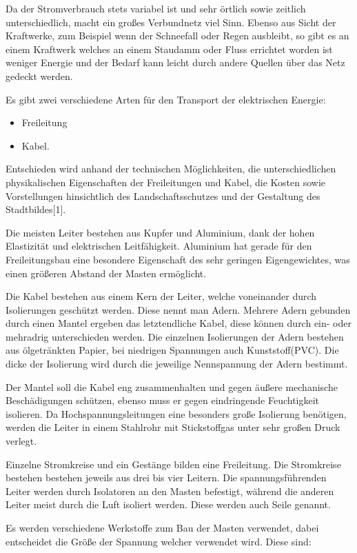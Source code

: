 Da der Stromverbrauch stets variabel ist und sehr örtlich sowie zeitlich unterschiedlich, macht ein großes Verbundnetz viel Sinn. Ebenso aus Sicht der Kraftwerke, zum Beispiel wenn der Schneefall oder Regen ausbleibt, so gibt es an einem Kraftwerk welches an einem Staudamm oder Fluss errichtet worden ist weniger Energie und der Bedarf kann leicht durch andere Quellen über das Netz gedeckt werden.\newline

Es gibt zwei verschiedene Arten für den Transport der elektrischen Energie:
\begin{itemize}
	\item Freileitung
	\item Kabel.
\end{itemize} 
Entschieden wird anhand der technischen Möglichkeiten, die unterschiedlichen physikalischen Eigenschaften der Freileitungen und Kabel, die Kosten sowie Vorstellungen hinsichtlich des Landschaftsschutzes und der Gestaltung des Stadtbildes[1].

Die meisten Leiter bestehen aus Kupfer und Aluminium, dank der hohen Elastizität und elektrischen Leitfähigkeit. Aluminium hat gerade für den Freileitungsbau eine besondere Eigenschaft des sehr geringen Eigengewichtes, was einen größeren Abstand der Masten ermöglicht.

Die Kabel bestehen aus einem Kern der Leiter, welche voneinander durch Isolierungen geschützt werden. Diese nennt man Adern. Mehrere Adern gebunden durch einen Mantel ergeben das letztendliche Kabel, diese können durch ein- oder mehradrig unterschieden werden. Die einzelnen Isolierungen der Adern bestehen aus ölgetränkten Papier, bei niedrigen Spannungen auch Kunststoff(PVC). Die dicke der Isolierung wird durch die jeweilige Nennspannung der Adern bestimmt.

Der Mantel soll die Kabel eng zusammenhalten und gegen äußere mechanische Beschädigungen schützen, ebenso muss er gegen eindringende Feuchtigkeit isolieren. Da Hochspannungsleitungen eine besonders große Isolierung benötigen, werden die Leiter in einem Stahlrohr mit Stickstoffgas unter sehr großen Druck verlegt.

Einzelne Stromkreise und ein Gestänge bilden eine Freileitung. Die Stromkreise bestehen bestehen jeweils aus drei bis vier Leitern. Die spannungsführenden Leiter werden durch Isolatoren an den Masten befestigt, während die anderen Leiter meist durch die Luft isoliert werden. Diese werden auch Seile genannt. 

Es werden verschiedene Werkstoffe zum Bau der Masten verwendet, dabei entscheidet die Größe der Spannung welcher verwendet wird. Diese sind:


